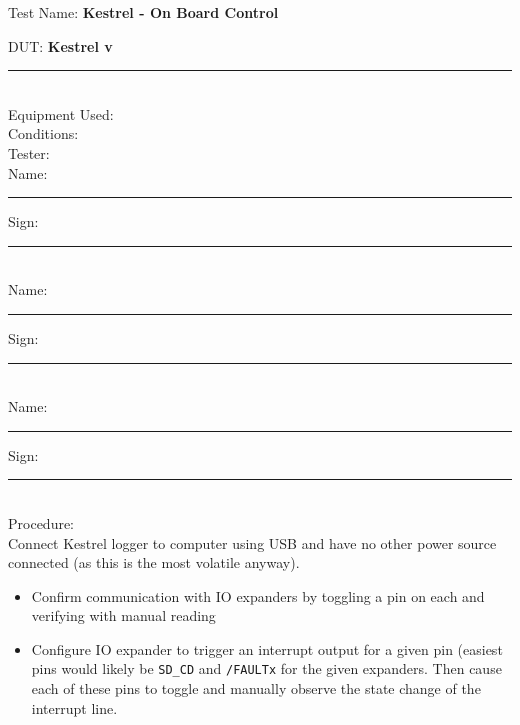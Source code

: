 \pagebreak
\noindent
{\Huge Test Name: \textbf{Kestrel - On Board Control}}\\[20pt]
{\Large DUT: \textbf{Kestrel v}\rule{1cm}{0.15mm}} \\[10pt]
{\Large Equipment Used: }\\[40pt]
{\Large Conditions: }\\[40pt]
{\Large Tester: }\\[10pt]
Name: \rule{4cm}{0.15mm} \hfill Sign: \rule{4cm}{0.15mm}\\[5pt]
Name: \rule{4cm}{0.15mm} \hfill Sign: \rule{4cm}{0.15mm}\\[5pt]
Name: \rule{4cm}{0.15mm} \hfill Sign: \rule{4cm}{0.15mm}\\[15pt]
{\Large Procedure: }\\
Connect Kestrel logger to computer using USB and have no other power source connected (as this is the most volatile anyway). 

\begin{itemize}
\item Confirm communication with IO expanders by toggling a pin on each and verifying with manual reading
\item Configure IO expander to trigger an interrupt output for a given pin (easiest pins would likely be \texttt{SD\_CD} and \texttt{/FAULTx} for the given expanders. Then cause each of these pins to toggle and manually observe the state change of the interrupt line. 
\end{itemize}


